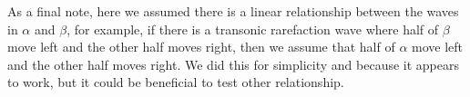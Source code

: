 \documentclass[12pt]{article}
\begin{document}
As a final note, here we assumed there is a linear relationship between the waves in $\alpha$ and
$\beta$, for example, if there is a transonic rarefaction wave where half of $\beta$ move left and
the other half moves right, then we assume that half of $\alpha$ move left and the other half moves
right. We did this for simplicity and because it appears to work, but it could be beneficial to test
other relationship.
\end{document}
